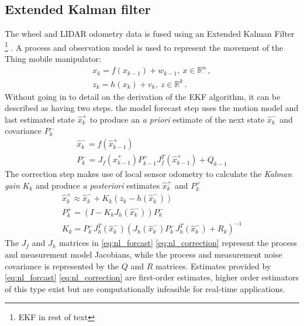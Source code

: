 \documentclass[times, utf8, diplomski, english]{fer}
\begin{document}
\subsection{Extended Kalman filter}
The wheel and LIDAR odometry data is fused using an Extended Kalman Filter \footnote{EKF in rest of text} \citep{fujii2013extended}.
A process and observation model is used to represent the movement of the Thing mobile manipulator:
\begin{subequations}\label{state_space_nl2}
\begin{gather}
x_k = f\left(x_{k-1}\right) + w_{k-1} , \ x \in \mathbb{R}^n\, , \\
z_k = h\left(x_k\right) + v_k, \ z \in \mathbb{R}^k\, .
\end{gather}
\end{subequations}
Without going in to detail on the derivation of the EKF algorithm, it can be described as having two steps.\:
the model forecast step uses the motion model and last estimated state $\hat{x}_k^+$ to produce an \textit{a priori} estimate of the next state $\hat{x}_k^-$ and covariance $P_k^-$
\begin{subequations}\label{eq:nl_forcast}
\begin{gather}
\hat{x}_k^- = f\left(\hat{x}_{k-1}^+\right) \\
P_k^- = J_f\left(\hat{x}_{k-1}^+\right)P_{k-1}^+J_f^T\left(\hat{x}_{k-1}^+\right) + Q_{k-1}
\end{gather}
\end{subequations}
The correction step makes use of local sensor odometry to calculate the \textit{Kalman gain} $K_k$ and produce \textit{a posteriori} estimates $\hat{x}_k^+$ and $P_k^+$ 
\begin{subequations}\label{eq:nl_correction}
\begin{gather}
\hat{x}_k^+ \approx \hat{x}_k^- + K_k\left(z_k - h\left(\hat{x}_k^-\right)\right) \\
P_k^+ = \left(I - K_kJ_h\left(\hat{x}_k^-\right)\right)P_k^- \\
K_k = P_k^-J_h^T\left(\hat{x}_k^-\right)\left(J_h\left(\hat{x}_k^-\right)P_k^-J_h^T\left(\hat{x}_k^-\right) + R_k\right)^{-1} 
\end{gather}
\end{subequations}
The $J_f$ and $J_h$ matrices in \eqref{eq:nl_forcast} \eqref{eq:nl_correction} represent the process and measurement model Jacobians, while the process and measurement noise covariance is represented by the $Q$ and $R$ matrices.
Estimates provided by \eqref{eq:nl_forcast} \eqref{eq:nl_correction} are first-order estimates, higher order estimators of this type exist but are computationally infeasible for real-time applications.
\end{document}

